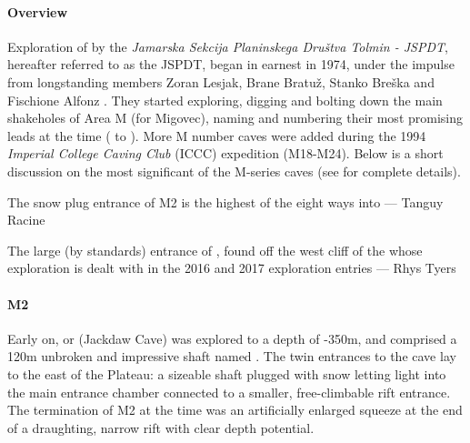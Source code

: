 \paragraph{Overview} Exploration of  by the \textit{Jamarska Sekcija Planinskega Društva Tolmin - JSPDT},  hereafter referred to as the JSPDT, began in earnest in 1974, under the impulse from longstanding members Zoran Lesjak, Brane Bratuž, Stanko Breška and Fischione Alfonz \citep{hm1}. They started exploring, digging and bolting down the main shakeholes of Area M (for Migovec), naming and numbering their most promising leads at the time ( to ). More M number caves were added during the 1994 \textit{Imperial College Caving Club} (ICCC) expedition (M18-M24). Below is a short discussion on the most significant of the M-series caves (see \citet{hm1} for complete details). 

\begin{marginfigure}
\checkoddpage \ifoddpage \forcerectofloat \else \forceversofloat \fi
\centering
 \caption{The snow plug entrance of M2 is the highest of the eight ways into \protect{} --- Tanguy Racine}
 \label{surfaceM2}
\end{marginfigure}

\begin{marginfigure}
\checkoddpage \ifoddpage \forcerectofloat \else \forceversofloat \fi
\centering
 \caption{The large (by \protect{} standards) entrance of \protect{}, found off the west cliff of the \protect{} whose exploration is dealt with in the 2016 and 2017 exploration entries --- Rhys Tyers}
 \label{surfaceM2}
\end{marginfigure}

\paragraph{M2} Early on,  or  (Jackdaw Cave) was explored to a depth of -350m, and comprised a 120m unbroken and impressive shaft named . The twin entrances to the cave lay to the east of the Plateau: a sizeable shaft plugged with snow letting light into the main entrance chamber connected to a smaller, free-climbable rift entrance. The termination of M2 at the time was an artificially enlarged squeeze at the end of a draughting, narrow rift with clear depth potential.

